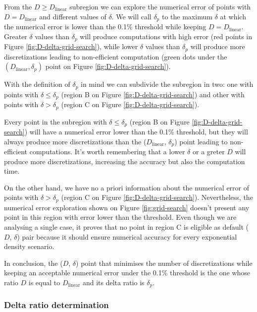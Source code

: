 \documentclass[extra]{gji}
\begin{document}
From the $D \ge D_\text{linear}$ subregion we can explore the numerical 
error of points with $D = D_\text{linear}$ and different values of 
$\delta$.
We will call $\delta_p$ to the maximum $\delta$ at which the numerical 
error is lower than the 0.1\% threshold while keeping
$D = D_ \text{linear}$.
Greater $\delta$ values than $\delta_p$ will produce computations with 
high error (red points in Figure \ref{fig:D-delta-grid-search}), while 
lower $\delta$ values than $\delta_p$ will produce more discretizations 
leading to non-efficient computation (green dots under the 
$(D_\text{linear}, \delta_p)$ point on Figure \ref{fig:D-delta-grid-search}).

With the definition of $\delta_p$ in mind we can subdivide the 
subregion in two: one with points with $\delta \le \delta_p$ (region B 
on Figure \ref{fig:D-delta-grid-search}) and other with points with 
$\delta > \delta_p$ (region C on Figure \ref{fig:D-delta-grid-search}).

Every point in the subregion with $\delta \le \delta_p$ (region B on 
Figure \ref{fig:D-delta-grid-search}) will have a numerical error lower 
than the 0.1\% threshold, but they will always produce more 
discretizations than the ($D_\text{linear}$, $\delta_p$) point leading 
to non-efficient computations.
It's worth remembering that a lower $\delta$ or a greter $D$ will 
produce more discretizations, increasing the accuracy but also the 
computation time.

On the other hand, we have no a priori information about the numerical 
error of points with $\delta > \delta_p$ (region C on 
Figure \ref{fig:D-delta-grid-search}).
Nevertheless, the numerical error exploration shown on
Figure \ref{fig:grid-search} doesn't present any 
point in this region with error lower than the threshold.
Even though we are analysing a single case, it proves that no point in 
region C is eligible as default ($D$, $\delta$) pair because it should 
ensure numerical accuracy for every exponential density scenario.

In conclusion, the ($D$, $\delta$) point that minimises the number of 
discretizations while keeping an acceptable numerical error under the 
0.1\% threshold is the one whose ratio $D$ is equal to 
$D_\text{linear}$ and its delta ratio is $\delta_p$.

\subsubsection{Delta ratio determination}
\end{document}
